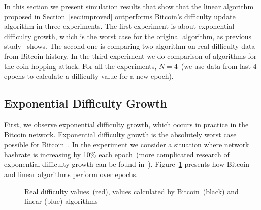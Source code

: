 \documentclass[]{llncs}
\begin{document}
In this section we present simulation results that show that the linear algorithm proposed in Section~\ref{sec:improved} outperforms Bitcoin's difficulty update algorithm in three experiments. The first experiment is about exponential difficulty growth, which is the worst case for the original algorithm, as previous study~\cite{kraft2015difficulty} shows. The second one is comparing two algorithm on real difficulty data from Bitcoin history. In the third experiment we do comparison of algorithms for the coin-hopping attack. For all the experiments, $N=4$~(we use data from last 4 epochs to calculate a difficulty value for a new epoch).  

\subsection{Exponential Difficulty Growth}
\label{sec:experiment}
First, we observe exponential difficulty growth, which occurs in practice in the Bitcoin network. Exponential difficulty growth is the absolutely worst case possible for Bitcoin~\cite{kraft2015difficulty}.
In the experiment we consider a situation where network hashrate is increasing by 10\% each epoch~(more complicated research of exponential difficulty growth can be found in~\cite{kraft2015difficulty}).
Figure~\ref{fig:exp} presents how Bitcoin and linear algorithms perform over epochs.

\begin{figure}[h]
\caption{Real difficulty values~(red), values calculated by Bitcoin~(black) and linear (blue) algorithms}
\label{fig:exp}
\end{figure}
\end{document}
